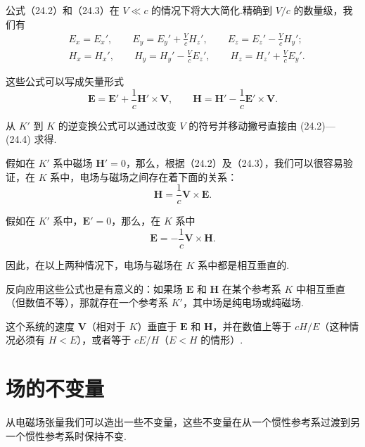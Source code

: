 公式（24.2）和（24.3）在 $V\ll c$
的情况下将大大简化.精确到 $V/c$ 的数量级，我们有
\begin{equation*}
\begin{aligned}
  &E_x=E_x',\qquad
  E_y=E_y'+\frac{V}{c}H_z',\qquad
  E_z=E_z'-\frac{V}{c}H_y';\\
  &H_x=H_x',\qquad
  H_y=H_y'-\frac{V}{c}E_z',\qquad
  H_z=H_z'+\frac{V}{c}E_y'.
\end{aligned}
\end{equation*}

这些公式可以写成矢量形式
\begin{equation}
  \boldsymbol{E}=\boldsymbol{E}'
  +\frac{1}{c}\boldsymbol{H}'\times\boldsymbol{V},\qquad
  \boldsymbol{H}=\boldsymbol{H}'
  -\frac{1}{c}\boldsymbol{E}'\times\boldsymbol{V}.
\end{equation}

从 $K'$ 到 $K$ 的逆变换公式可以通过改变 $V$ 的符号并移动撇号直接由
(24.2)—(24.4) 求得.

假如在 $K'$ 系中磁场 $\boldsymbol{H}'=0$，那么，根据（24.2）及（24.3），我们可以很容易验证，在 $K$
系中，电场与磁场之间存在着下面的关系：
\begin{equation}
  \boldsymbol{H}=\frac{1}{c}\boldsymbol{V}\times\boldsymbol{E}.
\end{equation}

假如在 $K'$ 系中，$\boldsymbol{E}'=0$，那么，在 $K$ 系中
\begin{equation}
  \boldsymbol{E}=-\frac{1}{c}\boldsymbol{V}\times\boldsymbol{H}.
\end{equation}

因此，在以上两种情况下，电场与磁场在 $K$ 系中都是相互垂直的.

反向应用这些公式也是有意义的：如果场 $\boldsymbol{E}$ 和 $\boldsymbol{H}$
在某个参考系 $K$ 中相互垂直（但数值不等），那就存在一个参考系 $K'$，其中场是纯电场或纯磁场.

这个系统的速度 $\boldsymbol{V}$（相对于 $K$）垂直于 $\boldsymbol{E}$ 和 $\boldsymbol{H}$，并在数值上等于
$cH/E$（这种情况必须有 $H<E$），或者等于 $cE/H$（$E<H$ 的情形）.

\section{场的不变量}

从电磁场张量我们可以造出一些不变量，这些不变量在从一个惯性参考系过渡到另一个惯性参考系时保持不变.

